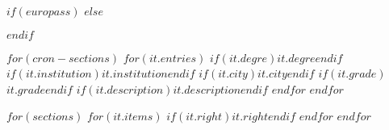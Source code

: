 \documentclass{europasscv}
\begin{document}
$if(europass)$
\ecvpersonalinfo
$else$
\maketitle
$endif$

$for(cron-sections)$
  $for(it.entries)$
    {$if(it.degre)$$it.degre$$endif$}
    {$if(it.institution)$$it.institution$$endif$}
    {$if(it.city)$$it.city$$endif$}
    {$if(it.grade)$$it.grade$$endif$}
    {$if(it.description)$$it.description$$endif$}
  $endfor$
$endfor$

$for(sections)$
  $for(it.items)$
    {$if(it.right)$$it.right$$endif$}
  $endfor$
$endfor$
\end{document}
